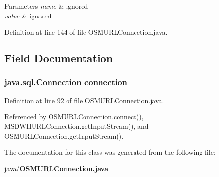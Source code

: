 \begin{DoxyParams}{Parameters}
{\em name} & ignored \\
\hline
{\em value} & ignored \\
\hline
\end{DoxyParams}


Definition at line 144 of file O\+S\+M\+U\+R\+L\+Connection.\+java.



\subsection{Field Documentation}
\subsubsection[{connection}]{\setlength{\rightskip}{0pt plus 5cm}java.\+sql.\+Connection connection\hspace{0.3cm}{\ttfamily [protected]}}\label{classorg_1_1smallfoot_1_1parser_1_1osmsql_1_1OSMURLConnection_a6b788764b81c8f58b7654c790ec4988d}


Definition at line 92 of file O\+S\+M\+U\+R\+L\+Connection.\+java.



Referenced by O\+S\+M\+U\+R\+L\+Connection.\+connect(), M\+S\+D\+W\+H\+U\+R\+L\+Connection.\+get\+Input\+Stream(), and O\+S\+M\+U\+R\+L\+Connection.\+get\+Input\+Stream().



The documentation for this class was generated from the following file\+:\begin{DoxyCompactItemize}
\item 
java/{\bf O\+S\+M\+U\+R\+L\+Connection.\+java}\end{DoxyCompactItemize}
